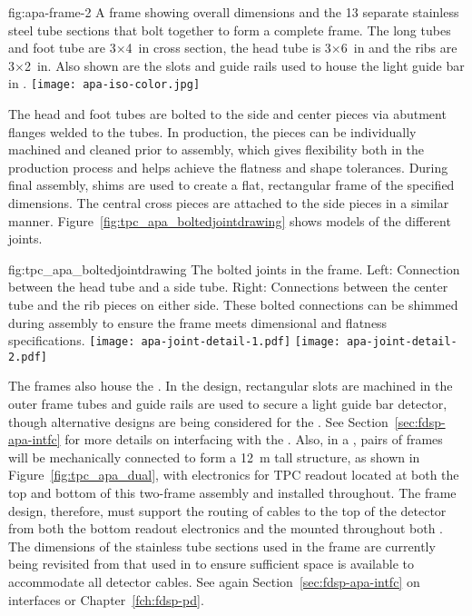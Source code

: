 \begin{dunefigure}{fig:apa-frame-2}
{A   frame showing overall dimensions and the \num{13} separate stainless steel tube sections that bolt together to form a complete frame.  The long tubes and foot tube are 3$\times$\SI{4}{in} cross section, the head tube is 3$\times$\SI{6}{in} and the ribs are \num{3}$\times$\SI{2}{in}. Also shown are the slots and guide rails used to house the light guide bar  in .}
\texttt{[image: apa-iso-color.jpg]} 
\end{dunefigure}

The head and foot tubes are bolted to the side and center pieces via abutment flanges welded to the tubes. In production, the pieces can be individually machined and cleaned prior to assembly, which gives flexibility both in the production process and helps achieve the flatness and shape tolerances.  During final assembly, shims are used to create a flat, rectangular frame of the specified dimensions.  The central cross pieces are attached to the side pieces in a similar manner.  Figure~\ref{fig:tpc_apa_boltedjointdrawing} shows models of the different joints.   

\begin{dunefigure}{fig:tpc_apa_boltedjointdrawing}
{The bolted joints in the  frame. Left: Connection between the head tube and a side tube. Right: Connections between the center tube and the rib pieces on either side.  These bolted connections can be shimmed during assembly to ensure the frame meets dimensional and flatness specifications.}
\texttt{[image: apa-joint-detail-1.pdf]} \quad
\texttt{[image: apa-joint-detail-2.pdf]} 
\end{dunefigure}

The  frames also house the .  In the  design, rectangular slots are machined in the outer frame tubes and guide rails are used to secure a light guide bar detector, though alternative  designs are being considered for the .%
See Section~\ref{sec:fdsp-apa-intfc} for more details on interfacing with the .  Also, in a , pairs of  frames will be mechanically connected to form a \SI{12}{m} tall structure, as shown in Figure~\ref{fig:tpc_apa_dual}, with electronics for TPC readout located at both the top and bottom of this two-frame assembly and  installed throughout.  The  frame design, therefore, must support the routing of cables to the top of the detector from both the bottom  readout electronics and the  mounted throughout both .  The dimensions of the stainless tube sections used in the frame are currently being revisited from that used in  to ensure sufficient space is available to accommodate all detector cables.  See again Section~\ref{sec:fdsp-apa-intfc} on interfaces or Chapter~\ref{fch:fdsp-pd}.

